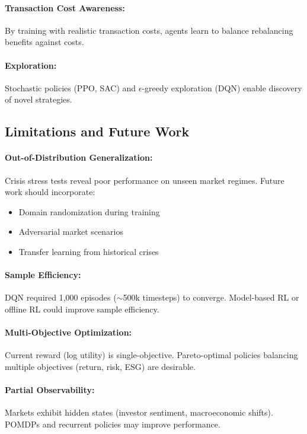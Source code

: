 \documentclass[12pt]{article}
\begin{document}
\paragraph{Transaction Cost Awareness:}
By training with realistic transaction costs, agents learn to balance rebalancing benefits against costs.

\paragraph{Exploration:}
Stochastic policies (PPO, SAC) and $\epsilon$-greedy exploration (DQN) enable discovery of novel strategies.

\subsection{Limitations and Future Work}

\paragraph{Out-of-Distribution Generalization:}
Crisis stress tests reveal poor performance on unseen market regimes. Future work should incorporate:
\begin{itemize}
    \item Domain randomization during training
    \item Adversarial market scenarios
    \item Transfer learning from historical crises
\end{itemize}

\paragraph{Sample Efficiency:}
DQN required 1,000 episodes ($\sim$500k timesteps) to converge. Model-based RL or offline RL could improve sample efficiency.

\paragraph{Multi-Objective Optimization:}
Current reward (log utility) is single-objective. Pareto-optimal policies balancing multiple objectives (return, risk, ESG) are desirable.

\paragraph{Partial Observability:}
Markets exhibit hidden states (investor sentiment, macroeconomic shifts). POMDPs and recurrent policies may improve performance.
\end{document}
